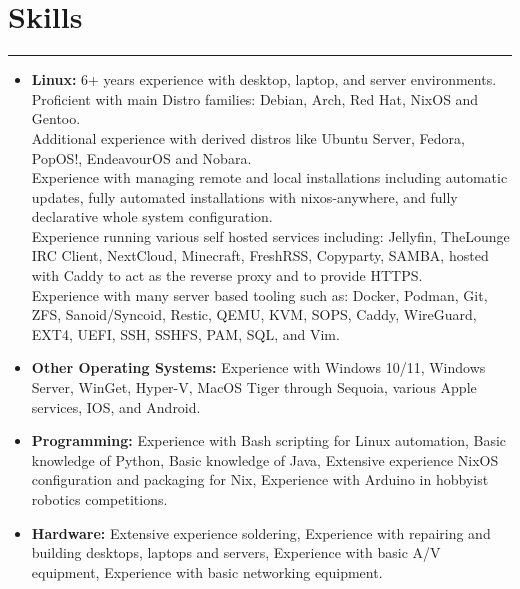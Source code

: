 \documentclass[a4paper,11pt]{article}
\begin{document}
\section*{\hspace*{1em} Skills}
\vspace{-0.2cm}
\hrule
\vspace{0.3cm}
\begin{itemize}
    \item \textbf{Linux:} 6+ years experience with desktop, laptop, and server environments. \\
    Proficient with main Distro families: Debian, Arch, Red Hat, NixOS and Gentoo. \\
    Additional experience with derived distros like Ubuntu Server, Fedora, PopOS!, EndeavourOS and Nobara. \\ 
    Experience with managing remote and local installations including automatic updates, fully automated installations with nixos-anywhere, and fully declarative whole system configuration. \\
    Experience running various self hosted services including: Jellyfin, TheLounge IRC Client, NextCloud, Minecraft, FreshRSS, Copyparty, SAMBA, hosted with Caddy to act as the reverse proxy and to provide HTTPS. \\
    Experience with many server based tooling such as: Docker, Podman, Git, ZFS, Sanoid/Syncoid, Restic, QEMU, KVM, SOPS, Caddy, WireGuard, EXT4, UEFI, SSH, SSHFS, PAM, SQL, and Vim. \\
    \vspace{-0.7cm}
    \item \textbf{Other Operating Systems:} Experience with Windows 10/11, Windows Server, WinGet, Hyper-V, MacOS Tiger through Sequoia, various Apple services, IOS, and Android. \\
    \vspace{-0.7cm}
    \item \textbf{Programming:} Experience with Bash scripting for Linux automation, Basic knowledge of Python, Basic knowledge of Java, Extensive experience NixOS configuration and packaging for Nix, Experience with Arduino in hobbyist robotics competitions. \\
    \vspace{-0.7cm}
    \item \textbf{Hardware:} Extensive experience soldering, Experience with repairing and building desktops, laptops and servers, Experience with basic A/V equipment, Experience with basic networking equipment. \\
\end{itemize} 
\end{document}
